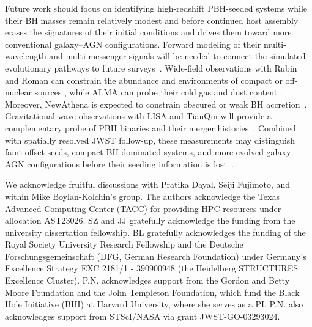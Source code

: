 \documentclass[twocolumn,trackchanges]{aastex701}
\begin{document}
Future work should focus on identifying high-redshift PBH-seeded systems while their BH masses remain relatively modest and before continued host assembly erases the signatures of their initial conditions and drives them toward more conventional galaxy--AGN configurations. Forward modeling of their multi-wavelength and multi-messenger signals will be needed to connect the simulated evolutionary pathways to future surveys~\citep[for related work, see, e.g.,][]{DeRosa2019NewAR..8601525D, Zhou2026arXiv}. Wide-field observations with Rubin and Roman can constrain the abundance and environments of compact or off-nuclear sources \citep[e.g.,][]{Latif2025}, while ALMA can probe their cold gas and dust content \citep[e.g.,][]{DeRossi2023}. Moreover, NewAthena is expected to constrain obscured or weak BH accretion~\citep[e.g.,][]{Inayoshi2024ApJ...966..164I, LabbeLRD2025ApJ...978...92L,NewAthena2025NatAs}. Gravitational-wave observations with LISA and TianQin will provide a complementary probe of PBH binaries and their merger histories~\citep[e.g.,][]{TianQin2016CQGra..33c5010L, LISA2017arXiv170200786A,TianQin2025RPPh...88e6901L}. Combined with spatially resolved JWST follow-up, these measurements may distinguish faint offset seeds, compact BH-dominated systems, and more evolved galaxy--AGN configurations before their seeding information is lost~\citep[e.g.,][]{GolubchikVENUS2026A&A,QSO1Direct2026Natur}.

\begin{acknowledgments}
 We acknowledge fruitful discussions with Pratika Dayal, Seiji Fujimoto, and within Mike Boylan-Kolchin's group. The authors acknowledge the Texas Advanced Computing Center (TACC) for providing HPC resources under allocation AST23026. SZ and JJ gratefully acknowledge the funding from the university dissertation fellowship. BL gratefully acknowledges the funding of the Royal Society University Research Fellowship and the Deutsche Forschungsgemeinschaft (DFG, German Research Foundation) under Germany's Excellence Strategy EXC 2181/1 - 390900948 (the Heidelberg STRUCTURES Excellence Cluster). P.N. acknowledges support from the Gordon and Betty Moore Foundation and the John Templeton Foundation, which fund the Black Hole Initiative (BHI) at Harvard University, where she serves as a PI. P.N. also acknowledges support from STScI/NASA via grant JWST-GO-03293024.
\end{acknowledgments}
\end{document}
